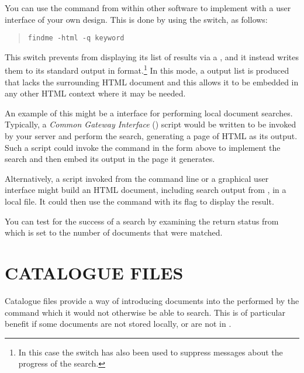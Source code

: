 You can use the  command from within other
software to implement  with a user interface of your
own design. This is done by using the  switch, as follows:

\begin{quote}
\begin{verbatim}
findme -html -q keyword
\end{verbatim}
\end{quote}

This switch prevents  from displaying its list of results
via a , and it instead
writes them to its standard output in 
format.\footnote{In this case the  switch has also been used to
suppress messages about the progress of the search.} In this mode, a
 output list is produced that lacks the surrounding HTML
document and this allows it to be embedded in any other HTML context
where it may be needed.

An example of this might be a  interface for
performing local document searches. Typically, a {\em Common Gateway
Interface} () script would be written to be invoked by
your  server and perform the search, generating a page of
HTML as its output. Such a script could invoke the  command
in the form above to implement the search and then embed its output in
the page it generates.

Alternatively, a script invoked from the command line or a graphical
user interface might build an HTML document, including search output
from , in a local file. It could then use the
 command with its  flag to display the
result.

You can test for the success of a search by examining the return
status from  which is set to the number of documents that
were matched.

\section{\label{sect:cataloguefiles}CATALOGUE FILES}

Catalogue files provide a way of introducing documents into the
 performed by the
 command which it would not otherwise be able
to search. This is of particular benefit if some documents are not
stored locally, or are not in .

